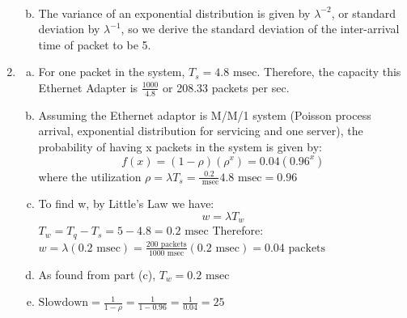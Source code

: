 \documentclass{article}   	                         %
\begin{document}
\begin{enumerate}[I]
\begin{enumerate}[(a)]
\begin{align*}
\end{align*}
\item
The variance of an exponential distribution is given by $\lambda ^{-2}$, or standard deviation by $\lambda ^{-1}$, so we derive the standard deviation of the inter-arrival time of packet to be 5.
\end{enumerate}
\item
\begin{enumerate}[(a)]
\item
For one packet in the system, $T_s = 4.8 \text{  msec}$.  Therefore, the capacity this Ethernet Adapter is $\frac{1000}{4.8}$ or 208.33 packets per sec.
\item
Assuming the Ethernet adaptor is M/M/1 system (Poisson process arrival, exponential distribution for servicing and one server), the probability of having x packets in the system is given by:\\
\begin{equation}f(x) = (1-\rho)(\rho^x) = 0.04(0.96^x)\end{equation}
where the utilization $\rho =\lambda T_s = \frac{0.2} {\text{  msec}} 4.8 \text{  msec}  = 0.96$
\item
To find w, by Little's Law we have:\\
\begin{equation} w = \lambda T_w \end{equation} 
$T_w = T_q - T_s = 5 - 4.8 = 0.2 \text{  msec}$
Therefore:\\
$w = \lambda (0.2 \text{  msec}) = \frac{200 \text{   packets}}{1000 \text{   msec}} (0.2 \text{  msec}) = 0.04 \text{   packets}$
\item
As found from part (c), $T_w = 0.2 \text{  msec}$
\item
$\text{Slowdown} = \frac{1}{1-\rho} = \frac{1}{1- 0.96} =  \frac{1}{0.04} = 25$ 
\end{enumerate}

\end{enumerate}
\end{document}

